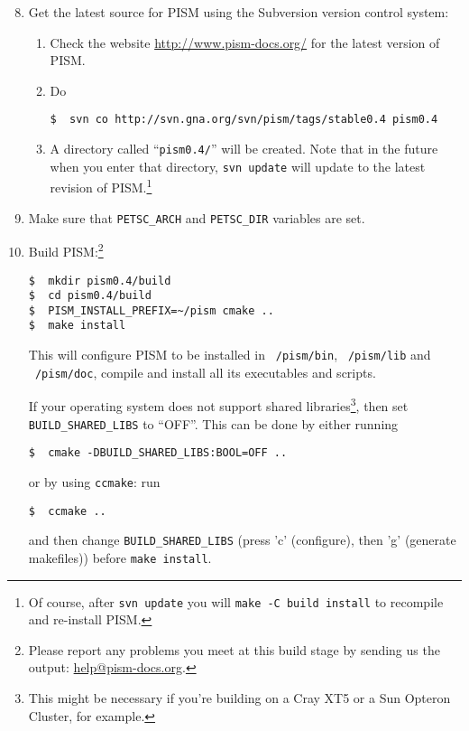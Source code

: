 \documentclass[11pt,final]{amsart}
\renewcommand{\t}[1]{\texttt{#1}}
\begin{document}
\begin{enumerate}\setcounter{enumi}{7}
\item Get the latest source for PISM using the Subversion version control system:
\begin{enumerate}
\item \label{getPISMstep} Check the website \url{http://www.pism-docs.org/} for the latest version of PISM.
\item Do
\begin{verbatim}
$  svn co http://svn.gna.org/svn/pism/tags/stable0.4 pism0.4
\end{verbatim}
\item A directory called ``\texttt{pism0.4/}'' will be created.  Note that in the future when you enter that directory,
  \texttt{svn update} will update to the latest revision of PISM.\footnote{Of course, after \t{svn update} you will \t{make -C
      build install} to recompile and re-install PISM.}
\end{enumerate}

\item Make sure that \texttt{PETSC_ARCH} and \texttt{PETSC_DIR} variables are set.

\item Build PISM:\footnote{Please report any problems you meet at this build stage by sending us the output: \href{mailto:help@pism-docs.org}{help@pism-docs.org}.}
\begin{verbatim}
$  mkdir pism0.4/build
$  cd pism0.4/build
$  PISM_INSTALL_PREFIX=~/pism cmake ..
$  make install
\end{verbatim}%

This will configure PISM to be installed in \texttt{~/pism/bin}, \texttt{~/pism/lib} and \texttt{~/pism/doc}, compile and install
all its executables and scripts.

If your operating system does not support shared libraries\footnote{This might be necessary if you're building on a Cray XT5 or a Sun Opteron Cluster, for example.}, then set \texttt{BUILD_SHARED_LIBS} to ``OFF''. This can be done by
either running
\begin{verbatim}
$  cmake -DBUILD_SHARED_LIBS:BOOL=OFF ..
\end{verbatim}%
or by using \texttt{ccmake}: run
\begin{verbatim}
$  ccmake ..
\end{verbatim}%
and then change \texttt{BUILD_SHARED_LIBS} (press 'c' (configure), then 'g' (generate makefiles))
before \texttt{make install}.


\end{enumerate}
\end{document}

